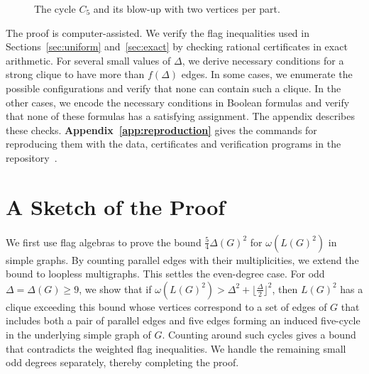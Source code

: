 \documentclass[preprint,11pt,numbers]{elsarticle-arxiv}
\numberwithin{equation}{section}
\theoremstyle{definition}
\begin{document}
\begin{figure}[!htbp]
\centering
{}
\caption{The cycle $C_5$ and its blow-up with two vertices per part.}
\label{fig:blowup}
\end{figure}

The proof is computer-assisted. We verify the flag inequalities used
in Sections~\ref{sec:uniform} and~\ref{sec:exact} by checking rational
certificates in exact arithmetic. For several small values of $\Delta$,
we derive necessary conditions for a strong clique to have more than
$f(\Delta)$ edges. In some cases, we enumerate the possible configurations
and verify that none can contain such a clique. In the other cases, we
encode the necessary conditions in Boolean formulas and verify that
none of these formulas has a satisfying assignment. The appendix describes
these checks. \textbf{Appendix~\ref{app:reproduction}} gives the commands
for reproducing them with the data, certificates and verification programs
in the repository~\cite{FGSTCode}.
\section{A Sketch of the Proof}\label{sec:overview}

We first use flag algebras to prove the bound $\frac{5}{4}\Delta(G)^2$
for $\omega(L(G)^2)$ in simple graphs. By counting parallel edges
with their multiplicities, we extend the bound to loopless multigraphs.
This settles the even-degree case.
For odd $\Delta=\Delta(G)\geq 9$, we show that if
$\omega(L(G)^2)>\Delta^2+\lfloor\frac{\Delta}{2}\rfloor^2$,
then $L(G)^2$ has a clique exceeding this bound whose vertices
correspond to a set of edges of $G$ that includes both a pair of
parallel edges and five edges forming an induced five-cycle in the
underlying simple graph of $G$. Counting around such cycles gives a
bound that contradicts the weighted flag inequalities. We handle the remaining small odd degrees separately,
thereby completing the proof.
\end{document}
